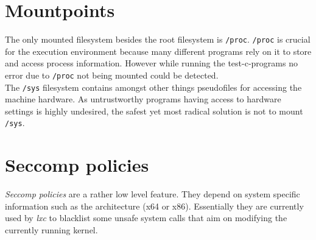 \section{Mountpoints}

The only mounted filesystem besides the root filesystem is \texttt{/proc}. \texttt{/proc} is crucial for the execution environment because many
different programs rely on it to store and access process information. However while running the test-c-programs no error due
to \texttt{/proc} not being mounted could be detected.\\
The \texttt{/sys} filesystem contains amongst other things pseudofiles for accessing the machine hardware. As untrustworthy programs
having access to hardware settings is highly undesired, the safest yet most radical solution is not to mount \texttt{/sys}.

\section{Seccomp policies}\label{seccomp}

\textit{Seccomp policies} are a rather low level feature. They depend on system specific information such
as the architecture (x64 or x86). Essentially they are currently used by \textit{lxc} to blacklist some unsafe system calls that aim on
modifying the currently running kernel.